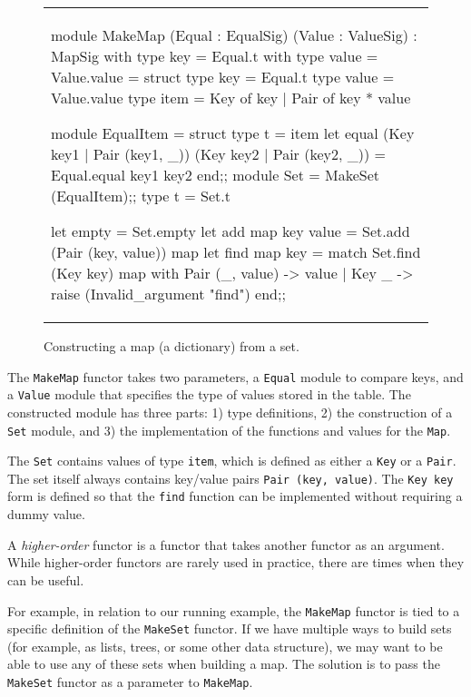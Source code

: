 \begin{figure}
\begin{center}
\begin{tabular}{l}
\begin{ocamllisting}
module MakeMap (Equal : EqualSig) (Value : ValueSig)
 : MapSig
   with type key = Equal.t
   with type value = Value.value
= struct
   type key = Equal.t
   type value = Value.value
   type item = Key of key | Pair of key * value

   module EqualItem = struct
      type t = item
      let equal (Key key1 | Pair (key1, _)) (Key key2 | Pair (key2, _)) =
         Equal.equal key1 key2
   end;;
   module Set = MakeSet (EqualItem);;
   type t = Set.t

   let empty = Set.empty
   let add map key value =
      Set.add (Pair (key, value)) map
   let find map key =
      match Set.find (Key key) map with
         Pair (_, value) -> value
       | Key _ ->
            raise (Invalid_argument "find")
end;;
\end{ocamllisting}
\end{tabular}
\end{center}
\caption{Constructing a map (a dictionary) from a set.}
\end{figure}

The \hbox{\lstinline/MakeMap/} functor takes two parameters,
a \hbox{\lstinline/Equal/} module to compare keys, and
a \hbox{\lstinline/Value/} module that specifies the type of values
stored in the table.  The constructed module has three parts: 1) type
definitions, 2) the construction of a \hbox{\lstinline$Set$} module,
and 3) the implementation of the functions and values for
the \hbox{\lstinline$Map$}.

The \hbox{\lstinline$Set$} contains values of
type \hbox{\lstinline$item$}, which is defined as either
a \hbox{\lstinline$Key$} or a \hbox{\lstinline$Pair$}.  The set itself
always contains key/value pairs \hbox{\lstinline$Pair (key, value)$}.
The \hbox{\lstinline$Key key$} form is defined so that
the \hbox{\lstinline$find$} function can be implemented without
requiring a dummy value.


A \emph{higher-order} functor is a functor that takes another functor
as an argument. While higher-order functors are rarely used in
practice, there are times when they can be useful.

For example, in relation to our running example,
the \hbox{\lstinline/MakeMap/} functor is tied to a specific
definition of the \hbox{\lstinline/MakeSet/} functor. If we have
multiple ways to build sets (for example, as lists, trees, or some
other data structure), we may want to be able to use any of these sets
when building a map. The solution is to pass
the \hbox{\lstinline/MakeSet/} functor as a parameter
to \hbox{\lstinline/MakeMap/}.

